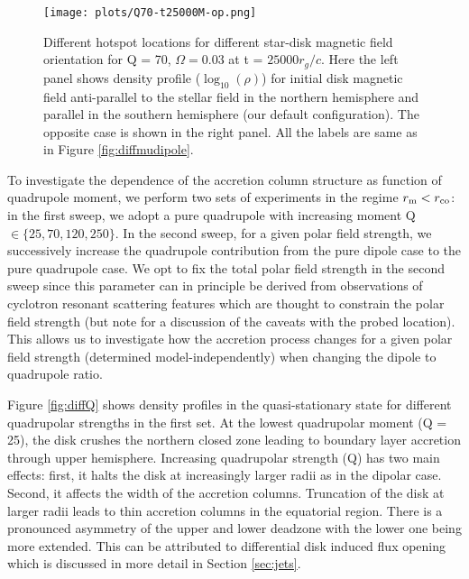 \documentclass[fleqn,usenatbib]{mnras}
\begin{document}
\begin{figure}
   \centering
    \texttt{[image: plots/Q70-t25000M-op.png]}
    \caption{Different hotspot locations for different star-disk magnetic field orientation for Q = 70, $\Omega=0.03$ at t = $25000 r_g/c$. Here the left panel shows density profile ($\log_{10}(\rho)$) for initial disk magnetic field anti-parallel to the stellar field in the northern hemisphere and parallel in the southern hemisphere (our default configuration). The opposite case is shown in the right panel. All the labels are same as in Figure \ref{fig:diffmudipole}.}%
    \label{fig:diff-disk}
    \vspace{-4mm}
 \end{figure}
 
 To investigate the dependence of the accretion column structure as function of quadrupole moment, we perform two sets of experiments in the regime $r_{\rm m}< r_{\rm co}$: in the first sweep, we adopt a pure quadrupole with increasing  moment Q$\in\{25,70,120,250\}$.  In the second sweep, for a given polar field strength, we successively increase the quadrupole contribution from the pure dipole case to the pure quadrupole case.  
We opt to fix the total polar field strength in the second sweep since this parameter can in principle be derived from observations of cyclotron resonant scattering features \citep[see][]{StaubertTrumperEtAl2019} which are thought to constrain the polar field strength (but note \citet{KylafisTrumperEtAl2021a} for a discussion of the caveats with the probed location).  This allows us to investigate how the accretion process changes for a given polar field strength (determined model-independently) when changing the dipole to quadrupole ratio. 
 \begin{figure*}
    \centering
    \caption{Different hotspot size for different magnetic strengths. Density profiles at t = $28120 r_g/c$. (a) Q = 25, (b) Q = 70, (c) Q = 120, (d) Q = 250. All the labels are same as in Figure \ref{fig:diffmudipole}.}
    \label{fig:diffQ}
\end{figure*}
 Figure \ref{fig:diffQ} shows density profiles in the quasi-stationary state for different quadrupolar strengths in the first set. 
 At the lowest quadrupolar moment (Q = 25), the disk crushes the northern closed zone leading to boundary layer accretion through upper hemisphere. Increasing quadrupolar strength (Q) has two main effects: 
 first, it halts the disk at increasingly larger radii as in the dipolar case. 
 Second, it affects the width of the accretion columns. Truncation of the disk at larger radii leads to thin accretion columns in the equatorial region.  
 There is a pronounced asymmetry of the upper and lower deadzone with the lower one being more extended. This can be attributed to differential disk induced flux opening which is discussed in more detail in Section \ref{sec:jets}. 
 
\end{document}
